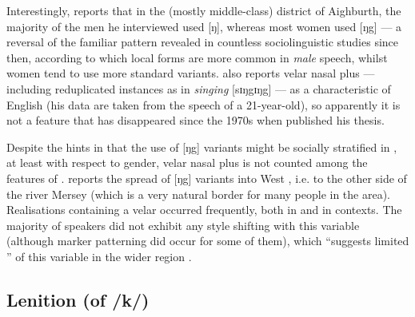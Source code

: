 Interestingly, \citeauthor{knowles1973} reports that in the (mostly middle-class) district of Aighburth, the majority of the men he interviewed used [ŋ], whereas most women used [ŋg] \citeyearpar[cf.][295]{knowles1973} --- a reversal of the familiar pattern revealed in countless sociolinguistic studies since then, according to which local forms are more common in \emph{male} speech, whilst women tend to use more standard variants.
\citet[352]{watson2007} also reports velar nasal plus --- including reduplicated instances as in \emph{singing} [sɪŋgɪŋg] --- as a characteristic of  English (his data are taken from the speech of a 21-year-old), so apparently it is not a feature that has disappeared since the 1970s when \citeauthor{knowles1973} published his thesis.

Despite the hints in \textcite{knowles1973} that the use of [ŋg] variants might be socially stratified in , at least with respect to gender, velar nasal plus is not counted among the  features of .
\textcite[98]{newbrook1999} reports the spread of [ŋg] variants into West , i.e. to the other side of the river Mersey (which is a very  natural border for many people in the area).
Realisations containing a velar  occurred frequently, both in  and in  contexts.
The majority of speakers did not exhibit any style shifting with this variable (although marker patterning did occur for some of them), which ``suggests limited '' of this variable in the wider  region \parencite[98]{newbrook1999}.

		\subsection{Lenition (of /k/)}\label{sec.var.con.len}

